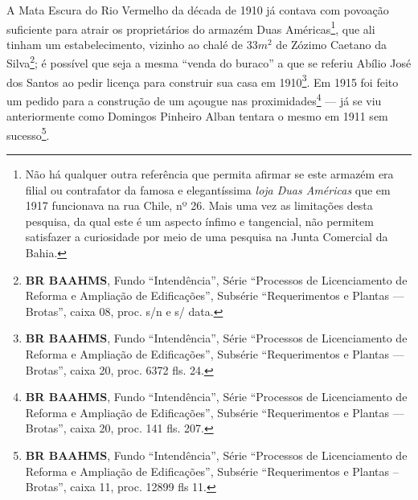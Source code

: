 A Mata Escura do Rio Vermelho da década de 1910 já contava com povoação suficiente para atrair os proprietários do armazém Duas Américas\footnote{Não há qualquer outra referência que permita afirmar se este armazém era filial ou contrafator da famosa e elegantíssima \textit{loja Duas Américas} que em 1917 funcionava na rua Chile, nº 26. Mais uma vez as limitações desta pesquisa, da qual este é um aspecto ínfimo e tangencial, não permitem satisfazer a curiosidade por meio de uma pesquisa na Junta Comercial da Bahia.}, que ali tinham um estabelecimento, vizinho ao chalé de 33$m^{2}$ de Zózimo Caetano da Silva\footnote{\textbf{BR BAAHMS}, Fundo ``Intendência'', Série ``Processos de Licenciamento de Reforma e Ampliação de Edificações'', Subsérie ``Requerimentos e Plantas --- Brotas'', caixa 08, proc. s/n e s/ data.}; é possível que seja a mesma ``venda do buraco'' a que se referiu Abílio José dos Santos ao pedir licença para construir sua casa em 1910\footnote{\textbf{BR BAAHMS}, Fundo ``Intendência'', Série ``Processos de Licenciamento de Reforma e Ampliação de Edificações'', Subsérie ``Requerimentos e Plantas --- Brotas'', caixa 20, proc. 6372 fls. 24.}. Em 1915 foi feito um pedido para a construção de um açougue nas proximidades\footnote{\textbf{BR BAAHMS}, Fundo ``Intendência'', Série ``Processos de Licenciamento de Reforma e Ampliação de Edificações'', Subsérie ``Requerimentos e Plantas --- Brotas'', caixa 20, proc. 141 fls. 207.} --- já se viu anteriormente como Domingos Pinheiro Alban tentara o mesmo em 1911 sem sucesso\footnote{\textbf{BR BAAHMS}, Fundo ``Intendência'', Série ``Processos de Licenciamento de Reforma e Ampliação de Edificações'', Subsérie ``Requerimentos e Plantas – Brotas'', caixa 11, proc. 12899 fls 11.}.





